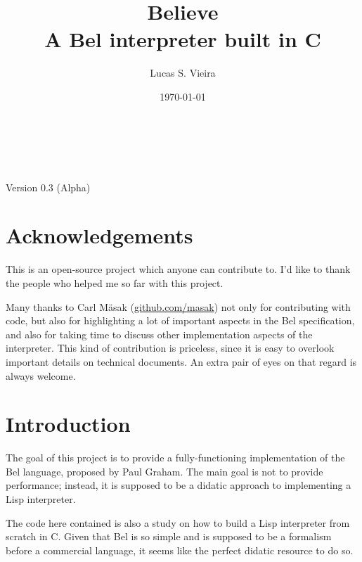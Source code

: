 \documentclass[openright,a4paper,twoside,12pt]{memoir}
\author{Lucas S. Vieira}
\date{\today}
\title{Believe\\\medskip
\large A Bel interpreter built in C}
\begin{document}
\frenchspacing


\frontmatter

\makeatletter
\begin{titlingpage}
\phantom{xxx}
\vspace{0.5cm}
\huge
\raggedright
\@author\\
\vspace{2.5cm}
\huge
{\raggedleft

\textbf{\HUGE\textcolor{blue}{\@title}}\\
{\large Version 0.3 (Alpha)}\\[1cm]
}
\centering
\vfill
\Large
\vfill
\@date
\end{titlingpage}
\makeatother

\setcounter{secnumdepth}{5}
\setcounter{tocdepth}{5}
\tableofcontents*
\cleardoublepage

\mainmatter

\chapter*{Acknowledgements}
\label{sec:org89cee91}

This is an open-source project which anyone can contribute to. I'd
like to thank the people who helped me so far with this project.

Many thanks to Carl Mäsak (\href{https://github.com/masak}{github.com/masak}) not only for contributing
with code, but also for highlighting a lot of important aspects in the
Bel specification, and also for taking time to discuss other
implementation aspects of the interpreter. This kind of contribution
is priceless, since it is easy to overlook important details on
technical documents. An extra pair of eyes on that regard is always
welcome.

\chapter{Introduction}
\label{sec:orgc091e60}

The goal of this project is to provide a fully-functioning
implementation of the Bel language, proposed by Paul Graham. The main
goal is not to provide performance; instead, it is supposed to be a
didatic approach to implementing a Lisp interpreter.

The code here contained is also a study on how to build a Lisp
interpreter from scratch in C. Given that Bel is so simple and is
supposed to be a formalism before a commercial language, it seems like
the perfect didatic resource to do so.
\end{document}
